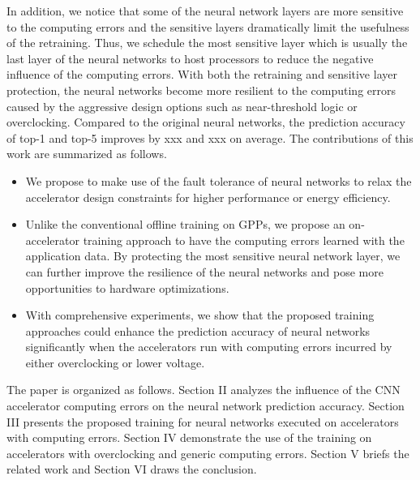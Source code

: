 In addition, we notice that some of the neural network layers are more sensitive to the 
computing errors and the sensitive layers dramatically limit the usefulness of the retraining. 
Thus, we schedule the most sensitive layer which is usually the last 
layer of the neural networks to host processors to reduce the negative influence 
of the computing errors. With both the retraining and sensitive layer protection, 
the neural networks become more resilient to the computing errors caused by 
the aggressive design options such as near-threshold logic or overclocking.
Compared to the original neural networks, the prediction accuracy of top-1 and top-5 
improves by xxx and xxx on average. The contributions of this work are 
summarized as follows.

\begin{itemize}
	\item We propose to make use of the fault tolerance of neural networks to relax 
		the accelerator design constraints for higher performance or energy efficiency.

	\item Unlike the conventional offline training on GPPs, we propose 
		an on-accelerator training approach to have the computing errors 
		learned with the application data. By protecting the most sensitive 
		neural network layer, we can further improve the resilience of the 
		neural networks and pose more opportunities to hardware optimizations.

	\item With comprehensive experiments, we show that the proposed training approaches 
		could enhance the prediction accuracy of neural networks significantly 
		when the accelerators run with computing errors incurred by either 
		overclocking or lower voltage.
\end{itemize}
The paper is organized as follows. Section II analyzes the influence of 
the CNN accelerator computing errors on the neural network prediction accuracy. 
Section III presents the proposed training for neural networks executed on accelerators with computing errors.
Section IV demonstrate the use of the training on accelerators with overclocking and generic computing errors. 
Section V briefs the related work and Section VI draws the conclusion. 


